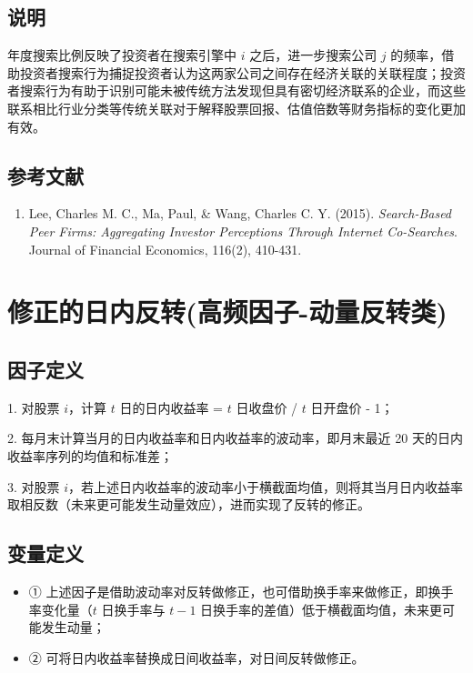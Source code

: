 \documentclass{article}
\begin{document}
\subsection{说明}
年度搜索比例反映了投资者在搜索引擎中 \( i \) 之后，进一步搜索公司 \( j \) 的频率，借助投资者搜索行为捕捉投资者认为这两家公司之间存在经济关联的关联程度；投资者搜索行为有助于识别可能未被传统方法发现但具有密切经济联系的企业，而这些联系相比行业分类等传统关联对于解释股票回报、估值倍数等财务指标的变化更加有效。

\subsection{参考文献}
\begin{enumerate}
    \item Lee, Charles M. C., Ma, Paul, \& Wang, Charles C. Y. (2015). \textit{Search-Based Peer Firms: Aggregating Investor Perceptions Through Internet Co-Searches}. Journal of Financial Economics, 116(2), 410-431.
\end{enumerate}

\section{修正的日内反转(高频因子-动量反转类)}

\subsection{因子定义}

1. 对股票 \( i \)，计算 \( t \) 日的日内收益率 = \( t \) 日收盘价 / \( t \) 日开盘价 - 1；

2. 每月末计算当月的日内收益率和日内收益率的波动率，即月末最近 20 天的日内收益率序列的均值和标准差；

3. 对股票 \( i \)，若上述日内收益率的波动率小于横截面均值，则将其当月日内收益率取相反数（未来更可能发生动量效应），进而实现了反转的修正。

\subsection{变量定义}
\begin{itemize}
    \item ① 上述因子是借助波动率对反转做修正，也可借助换手率来做修正，即换手率变化量（\( t \) 日换手率与 \( t-1 \) 日换手率的差值）低于横截面均值，未来更可能发生动量；
    \item ② 可将日内收益率替换成日间收益率，对日间反转做修正。
\end{itemize}
\end{document}
